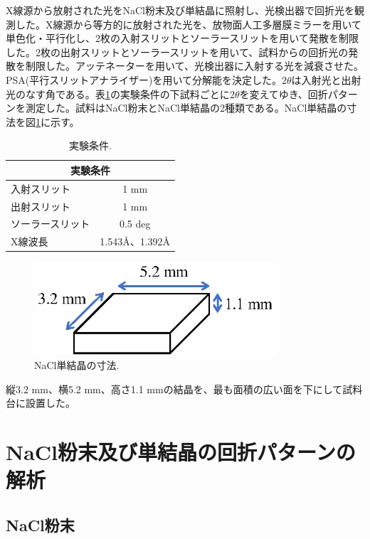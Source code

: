 \documentclass[11pt,a4j,uplatex]{jsarticle}
\begin{document}
X線源から放射された光をNaCl粉末及び単結晶に照射し、光検出器で回折光を観測した。X線源から等方的に放射された光を、放物面人工多層膜ミラーを用いて単色化・平行化し、2枚の入射スリットとソーラースリットを用いて発散を制限した。2枚の出射スリットとソーラースリットを用いて、試料からの回折光の発散を制限した。アッテネーターを用いて、光検出器に入射する光を減衰させた。PSA(平行スリットアナライザー)を用いて分解能を決定した。$2\theta$は入射光と出射光のなす角である。表\ref{exp}の実験条件の下試料ごとに$2\theta$を変えてゆき、回折パターンを測定した。試料はNaCl粉末とNaCl単結晶の2種類である。NaCl単結晶の寸法を図\ref{size}に示す。

\begin{table}[ht]
 \centering
 \caption{実験条件.}
 \begin{tabular}{lc}\hline
  \multicolumn{2}{c}{実験条件}          \\ \hline
  入射スリット     & 1 mm               \\
  出射スリット     & 1 mm               \\
  ソーラースリット & 0.5 deg            \\
  X線波長          & 1.543\AA、1.392\AA \\\hline
 \end{tabular}
 \label{exp}
\end{table}

\begin{figure}[htb]
 \centering
 \includegraphics[clip,width=9cm]{bulk.eps}
 \caption{NaCl単結晶の寸法.}
 \label{size}
\end{figure}

\newpage
縦3.2 mm、横5.2 mm、高さ1.1 mmの結晶を、最も面積の広い面を下にして試料台に設置した。

\newpage
\section{NaCl粉末及び単結晶の回折パターンの解析}


\subsection{NaCl粉末}
\end{document}
